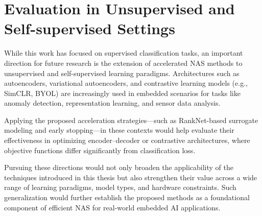 \section{Evaluation in Unsupervised and Self-supervised Settings}

While this work has focused on supervised classification tasks, an important direction for future research is the extension of accelerated NAS methods to unsupervised and self-supervised learning paradigms. Architectures such as autoencoders, variational autoencoders, and contrastive learning models (e.g., SimCLR, BYOL) are increasingly used in embedded scenarios for tasks like anomaly detection, representation learning, and sensor data analysis.

Applying the proposed acceleration strategies—such as RankNet-based surrogate modeling and early stopping—in these contexts would help evaluate their effectiveness in optimizing encoder–decoder or contrastive architectures, where objective functions differ significantly from classification loss.

\bigskip

Pursuing these directions would not only broaden the applicability of the techniques introduced in this thesis but also strengthen their value across a wide range of learning paradigms, model types, and hardware constraints. Such generalization would further establish the proposed methods as a foundational component of efficient NAS for real-world embedded AI applications.

